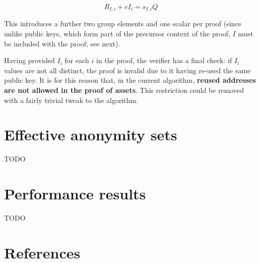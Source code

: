 \documentclass[10pt,a4paper]{article}
\begin{document}
$$ R_{I, i} + eI_i = s_{I, i} Q $$

This introduces a further two group elements and one scalar per proof (since unlike public keys, which form part of the precursor context of the proof, $I$ must be included with the proof; see next).

\vspace{5 pt}

Having provided $I_i$ for each $i$ in the proof, the verifier has a final check: if $I_i$ values are not all distinct, the proof is invalid due to it having re-used the same public key. It is for this reason that, in the current algorithm, \textbf{reused addresses are not allowed in the proof of assets}. This restriction could be removed with a fairly trivial tweak to the algorithm.

\section{Effective anonymity sets}

TODO

\section{Performance results}

TODO



\hypertarget{references}{%
\section[References]{\texorpdfstring{\protect\hypertarget{anchor-77}{}{}References}{References}}\label{references}}
\end{document}
